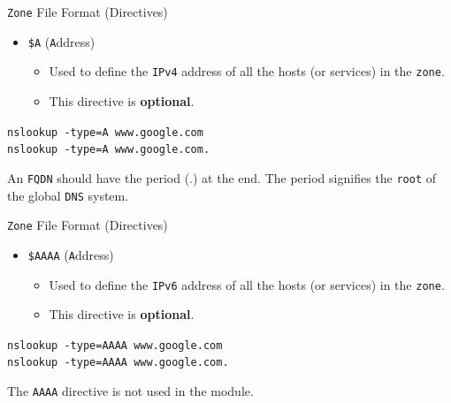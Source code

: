 \documentclass[xcolor=table]{beamer}
\begin{document}
\begin{frame}{\texttt{Zone} File Format (Directives)}
  \begin{itemize}
    \item \texttt{\$A} (\texttt{A}ddress)
       \begin{itemize}
          \item Used to define the \texttt{IPv4} address of all the hosts (or services) in the \texttt{zone}.
          \item This directive is \textbf{optional}.
       \end{itemize}
  \end{itemize}
  \begin{tcolorbox}
    \begin{center}
      \texttt{nslookup -type=A www.google.com}\\
      \texttt{nslookup -type=A www.google.com.}
    \end{center}
  \end{tcolorbox}
  \begin{tcolorbox}[title={\textbf{NOTE:}}]
      An \texttt{FQDN} should have the period (.) at the end. The period signifies the \texttt{root} of the global \texttt{DNS} system.
  \end{tcolorbox}
\end{frame}

\begin{frame}{\texttt{Zone} File Format (Directives)}
  \begin{itemize}
    \item \texttt{\$AAAA} (\texttt{A}ddress)
       \begin{itemize}
          \item Used to define the \texttt{IPv6} address of all the hosts (or services) in the \texttt{zone}.
          \item This directive is \textbf{optional}.
       \end{itemize}
  \end{itemize}
  \begin{tcolorbox}
    \begin{center}
      \texttt{nslookup -type=AAAA www.google.com}\\
      \texttt{nslookup -type=AAAA www.google.com.}
    \end{center}
  \end{tcolorbox}
  \begin{tcolorbox}[title={\textbf{NOTE:}}]
      The \texttt{AAAA} directive is not used in the module.
  \end{tcolorbox}
\end{frame}
\end{document}
